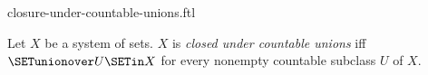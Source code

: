 \documentclass{stex}
\begin{document}
\begin{smodule}{closure-under-countable-unions.ftl}

\begin{definition}[forthel,id=FOUNDATIONS_14_2377279311183872]
  Let $X$ be a system of sets.
  $X$ is \emph{closed under countable unions} iff $\SETunionover U \SETin X$ for every nonempty countable subclass $U$ of $ X$.
\end{definition}
\end{smodule}
\end{document}
